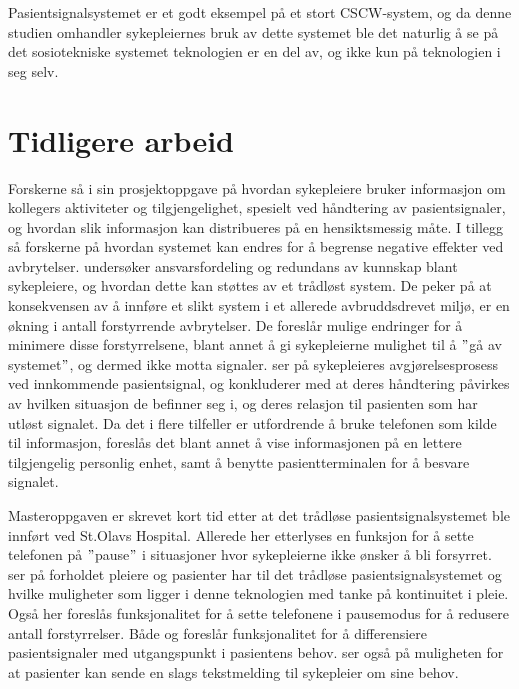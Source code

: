 \noindent
Pasientsignalsystemet er et godt eksempel på et stort CSCW-system, og da denne studien omhandler sykepleiernes bruk av dette systemet ble det naturlig å se på det sosiotekniske systemet teknologien er en del av, og ikke kun på teknologien i seg selv.

\section{Tidligere arbeid}
Forskerne så i sin prosjektoppgave \citep{Sund13} på hvordan sykepleiere bruker informasjon om kollegers aktiviteter og tilgjengelighet, spesielt ved håndtering av pasientsignaler, og hvordan slik informasjon kan distribueres på en hensiktsmessig måte. I tillegg så forskerne på hvordan systemet kan endres for å begrense negative effekter ved avbrytelser. \citet{KlemetsRedundancy} undersøker ansvarsfordeling og redundans av kunnskap blant sykepleiere, og hvordan dette kan støttes av et trådløst system. De peker på at konsekvensen av å innføre et slikt system i et allerede avbruddsdrevet miljø, er en økning i antall forstyrrende avbrytelser. De foreslår mulige endringer for å minimere disse forstyrrelsene, blant annet å gi sykepleierne mulighet til å $"$gå av systemet$"$, og dermed ikke motta signaler. \citet{klemets13} ser på sykepleieres avgjørelsesprosess ved innkommende pasientsignal, og konkluderer med at deres håndtering påvirkes av hvilken situasjon de befinner seg i, og deres relasjon til pasienten som har utløst signalet. Da det i flere tilfeller er utfordrende å bruke telefonen som kilde til informasjon, foreslås det blant annet å vise informasjonen på en lettere tilgjengelig personlig enhet, samt å benytte pasientterminalen for å besvare signalet.

\noindent
Masteroppgaven \citep{Sletten09} er skrevet kort tid etter at det trådløse pasientsignalsystemet ble innført ved St.Olavs Hospital. Allerede her etterlyses en funksjon for å sette telefonen på $"$pause$"$ i situasjoner hvor sykepleierne ikke ønsker å bli forsyrret. \citet{Rygh13} ser på forholdet pleiere og pasienter har til det trådløse pasientsignalsystemet og hvilke muligheter som ligger i denne teknologien med tanke på kontinuitet i pleie. Også her foreslås funksjonalitet for å sette telefonene i pausemodus for å redusere antall forstyrrelser. Både \citep{Rygh13} og \citep{Selseth12} foreslår funksjonalitet for å differensiere pasientsignaler med utgangspunkt i pasientens behov. \citet{Selseth12} ser også på muligheten for at pasienter kan sende en slags tekstmelding til sykepleier om sine behov.

